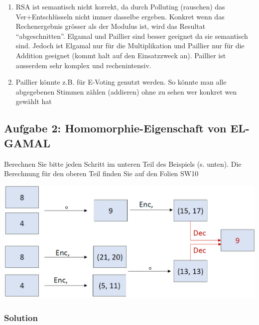 \documentclass[11pt]{article}
\begin{document}
\begin{enumerate}
\def\labelenumi{\arabic{enumi}.}
\item
  RSA ist semantisch nicht korrekt, da durch Polluting (rauschen) das
  Ver+Entschlüsseln nicht immer dasselbe ergeben. Konkret wenn das
  Rechenergebnis grösser als der Modulus ist, wird das Resultat
  ``abgeschnitten''. Elgamal und Paillier sind besser geeignet da sie
  semantisch sind. Jedoch ist Elgamal nur für die Multiplikation und
  Paillier nur für die Addition geeignet (kommt halt auf den
  Einsatzzweck an). Paillier ist ausserdem sehr komplex und
  rechenintensiv.
\item
  Paillier könnte z.B. für E-Voting genutzt werden. So könnte man alle
  abgegebenen Stimmen zählen (addieren) ohne zu sehen wer konkret wen
  gewählt hat
\end{enumerate}

    \hypertarget{aufgabe-2-homomorphie-eigenschaft-von-el-gamal}{%
\subsection{Aufgabe 2: Homomorphie-Eigenschaft von
EL-GAMAL}\label{aufgabe-2-homomorphie-eigenschaft-von-el-gamal}}

Berechnen Sie bitte jeden Schritt im unteren Teil des Beispiels (s.
unten). Die Berechnung für den oberen Teil finden Sie auf den Folien
SW10

\begin{center}
	\includegraphics[scale=0.6]{img/elgamal.png}
\end{center}

\hypertarget{solution}{%
\subsubsection{Solution}\label{solution}}
\end{document}
